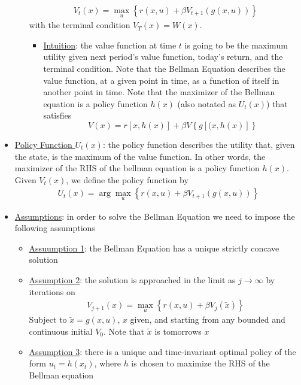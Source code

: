 \documentclass{article}
\begin{document}
\begin{itemize}
\begin{itemize}
        \begin{gather*}
            V_{t}(x) = \max_{u} \left\{ r(x,u) + \beta V_{t+1} (g(x, u)) \right\}
        \end{gather*}
        with the terminal condition $V_{T}(x) = W(x)$.
         \begin{itemize}
            \item  \underline{Intuition}: the value function at time $t$ is going to be the maximum utility given next period's value function, today's return, and the terminal condition. Note that the Bellman Equation describes the value function, at a given point in time, as a function of itself in another point in time. Note that the maximizer of the Bellman equation is a policy function $h(x)$ (also notated as $U_{t}(x)$) that satisfies $$V(x) = r[x, h(x)] + \beta V \left\{g[(x, h(x)] \right\}$$
         \end{itemize}
    \end{itemize}
    \item  \underline{Policy Function $U_{t}(x)$}: the policy function describes the utility that, given the state, is the maximum of the value function. In other words, the maximizer of the RHS of the bellman equation is a policy function $h(x)$. Given $V_{t}(x)$, we define the policy function by
    \begin{gather*}
        U_{t}(x) = \arg \max_{u} \left\{ r(x,u) + \beta V_{t+1} (g(x, u)) \right\}
    \end{gather*}
    \item \underline{Assumptions}: in order to solve the Bellman Equation we need to impose the following assumptions
    \begin{itemize}
        \item  \underline{Assuumption 1}: the Bellman Equation has a unique strictly concave solution
        \item  \underline{Assumption 2}: the solution is approached in the limit as $j \rightarrow \infty$ by iterations on
        \begin{gather*}
            V_{j+1}(x) = \max_{u} \left\{r(x,u) + \beta V_{j}(\widetilde{x}) \right\}
        \end{gather*}
        Subject to $\widetilde{x} = g(x,u)$, $x$ given, and starting from any bounded and continuous initial $V_{0}$. Note that $\widetilde{x}$ is tomorrows $x$
        \item  \underline{Assumption 3}: there is a unique and time-invariant optimal policy of the form $u_{t} = h(x_{t})$, where $h$ is chosen to maximize the RHS of the Bellman equation

\end{itemize}
\end{itemize}
\end{document}

